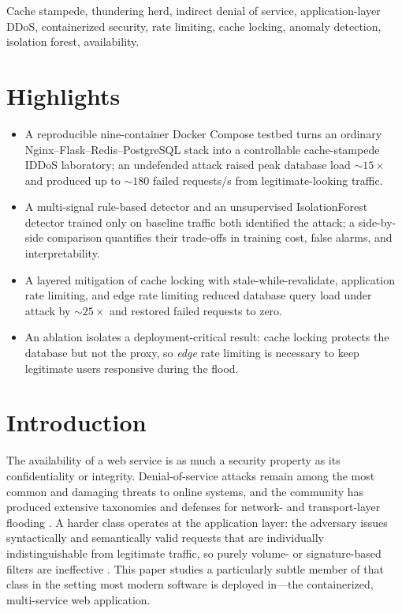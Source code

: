 \documentclass[conference]{IEEEtran}
\begin{document}
\begin{IEEEkeywords}
Cache stampede, thundering herd, indirect denial of service, application-layer
DDoS, containerized security, rate limiting, cache locking, anomaly detection,
isolation forest, availability.
\end{IEEEkeywords}

\section*{Highlights}
\begin{itemize}
\item A reproducible nine-container Docker Compose testbed turns an ordinary
Nginx--Flask--Redis--PostgreSQL stack into a controllable cache-stampede IDDoS
laboratory; an undefended attack raised peak database load ${\sim}15\times$ and
produced up to ${\sim}180$ failed requests/s from legitimate-looking traffic.
\item A multi-signal rule-based detector and an unsupervised IsolationForest
detector trained only on baseline traffic both identified the attack; a side-by-side
comparison quantifies their trade-offs in training cost, false alarms, and
interpretability.
\item A layered mitigation of cache locking with stale-while-revalidate, application
rate limiting, and edge rate limiting reduced database query load under attack by
${\sim}25\times$ and restored failed requests to zero.
\item An ablation isolates a deployment-critical result: cache locking protects the
database but not the proxy, so \emph{edge} rate limiting is necessary to keep
legitimate users responsive during the flood.
\end{itemize}

\section{Introduction}
The availability of a web service is as much a security property as its
confidentiality or integrity. Denial-of-service attacks remain among the most common
and damaging threats to online systems, and the community has produced extensive
taxonomies and defenses for network- and transport-layer flooding
\cite{mirkovic2004,zargar2013}. A harder class operates at the application layer: the
adversary issues syntactically and semantically valid requests that are individually
indistinguishable from legitimate traffic, so purely volume- or signature-based
filters are ineffective \cite{praseed2019,xie2009}. This paper studies a particularly
subtle member of that class in the setting most modern software is deployed in---the
containerized, multi-service web application.
\end{document}
